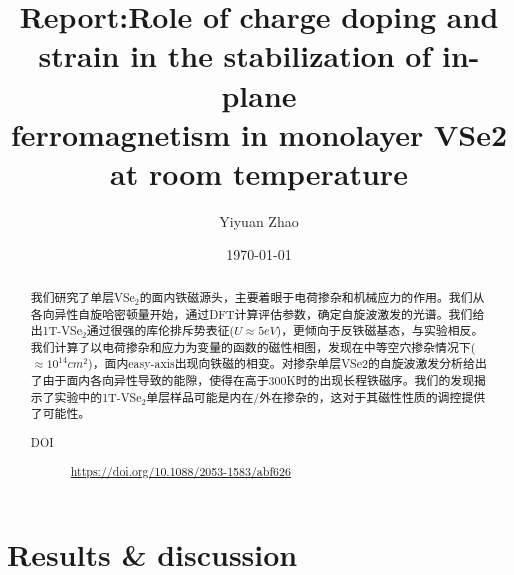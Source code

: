 \documentclass[reprint, aps, prb, showkeys]{revtex4-2}
\begin{document}
\title{Report:Role of charge doping and strain in the stabilization of in-plane \\
ferromagnetism in monolayer VSe2 at room temperature}

\author{Yiyuan Zhao}
\date{\today}

\begin{abstract}
我们研究了单层VSe$_2$的面内铁磁源头，主要着眼于电荷掺杂和机械应力的作用。我们从各向异性自旋哈密顿量开始，通过DFT计算评估参数，确定自旋波激发的光谱。我们给出1T-VSe$_2$通过很强的库伦排斥势表征($U \approx 5 eV$)，更倾向于反铁磁基态，与实验相反。我们计算了以电荷掺杂和应力为变量的函数的磁性相图，发现在中等空穴掺杂情况下($\approx 10^{14} cm^2$)，面内easy-axis出现向铁磁的相变。对掺杂单层VSe2的自旋波激发分析给出了由于面内各向异性导致的能隙，使得在高于300K时的出现长程铁磁序。我们的发现揭示了实验中的1T-VSe$_2$单层样品可能是内在/外在掺杂的，这对于其磁性性质的调控提供了可能性。

\begin{description}
    \item[DOI] \url{https://doi.org/10.1088/2053-1583/abf626}
\end{description}
\end{abstract}


\maketitle

\section{Results \& discussion}
\end{document}
